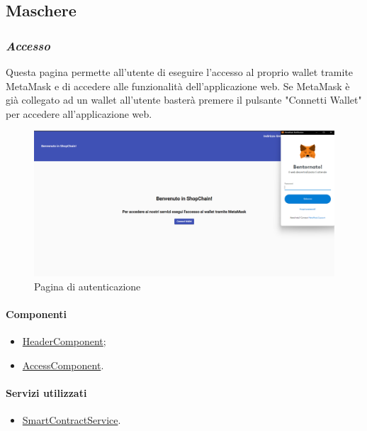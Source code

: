 \subsection{Maschere}

\subsubsection*{\textit{Accesso}}
Questa pagina permette all'utente di eseguire l'accesso al proprio wallet tramite MetaMask e di accedere alle funzionalità dell'applicazione web. Se MetaMask è già collegato ad un wallet all'utente basterà premere il pulsante "Connetti Wallet" per accedere all'applicazione web.

\begin{figure}[!h] 
    \centering 
    \includegraphics[width=1\columnwidth]{immagini/maschere/autenticazione.png} 
    \caption{Pagina di autenticazione}
\end{figure}

\paragraph{Componenti}
\begin{itemize}
    \item \hyperref[sec:header-component]{HeaderComponent};
    \item \hyperref[sec:access-component]{AccessComponent}.
\end{itemize}

\paragraph{Servizi utilizzati}
\begin{itemize}
    \item \hyperref[sec:smart-contract-service]{SmartContractService}.
\end{itemize}

